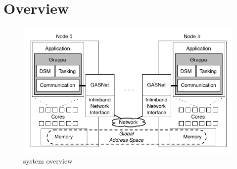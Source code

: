 \section{\Grappa Overview}


\begin{figure}[t]
\begin{center}
  \includegraphics[width=0.95\columnwidth]{figs/system-overview}
\begin{minipage}{0.95\columnwidth}
  \caption{\label{fig:grappa} \Grappa system overview}
\end{minipage}
\vspace{-3ex}
\end{center}
\end{figure}


